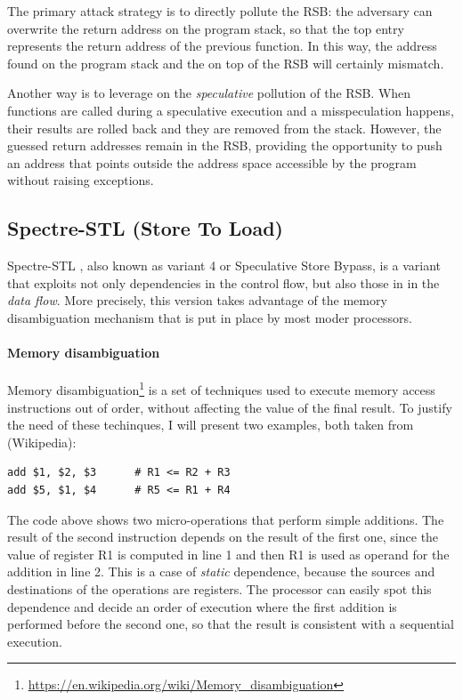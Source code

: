 \documentclass[12pt,a4paper]{book}
\theoremstyle{definition}
\begin{document}
	The primary attack strategy is to directly pollute the RSB: the adversary can overwrite the return address on the program stack, so that the top entry represents the return address of the previous function. In this way, the address found on the program stack and the on top of the RSB will certainly mismatch. 
	
	Another way is to leverage on the \textit{speculative} pollution of the RSB. When functions are called during a speculative execution and a misspeculation happens, their results are rolled back and they are removed from the stack. However, the guessed return addresses remain in the RSB, providing the opportunity to push an address that points outside the address space accessible by the program without raising exceptions.
	
	\subsection{Spectre-STL (Store To Load)}\label{sec:spectre-stl}
	Spectre-STL \cite{Canella2019}, also known as variant 4 or Speculative Store Bypass, is a variant that exploits not only dependencies in the control flow, but also those in in the \textit{data flow}. More precisely, this version takes advantage of the memory disambiguation mechanism that is put in place by most moder processors.
	
	\paragraph{Memory disambiguation} Memory disambiguation\footnote{\url{https://en.wikipedia.org/wiki/Memory_disambiguation}} is a set of techniques used to execute memory access instructions out of order, without affecting the value of the final result. To justify the need of these techinques, I will present two examples, both taken from (Wikipedia):
	
	\begin{lstlisting}
add $1, $2, $3      # R1 <= R2 + R3
add $5, $1, $4      # R5 <= R1 + R4
	\end{lstlisting}
	
	The code above shows two micro-operations that perform simple additions. The result of the second instruction depends on the result of the first one, since the value of register R1 is computed in line 1 and then R1 is used as operand for the addition in line 2. This is a case of \textit{static} dependence, because the sources and destinations of the operations are registers. The processor can easily spot this dependence and decide an order of execution where the first addition is performed before the second one, so that the result is consistent with a sequential execution.
	
\end{document}
